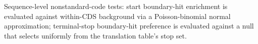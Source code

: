 Sequence-level nonstandard-code tests: start boundary-hit enrichment is evaluated against within-CDS background via a Poisson-binomial normal approximation; terminal-stop boundary-hit preference is evaluated against a null that selects uniformly from the translation table's stop set.
